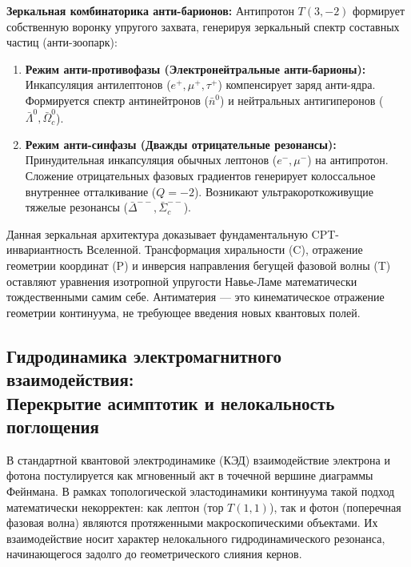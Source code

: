 \documentclass[11pt,a4paper]{article}
\begin{document}
	\textbf{Зеркальная комбинаторика анти-барионов:}
	Антипротон $T(3,-2)$ формирует собственную воронку упругого захвата, генерируя зеркальный спектр составных частиц (анти-зоопарк):
	\begin{enumerate}
		\item \textbf{Режим анти-противофазы (Электронейтральные анти-барионы):} Инкапсуляция антилептонов ($e^+, \mu^+, \tau^+$) компенсирует заряд анти-ядра. Формируется спектр антинейтронов ($\bar{n}^0$) и нейтральных антигиперонов ($\bar{\Lambda}^0, \bar{\Omega}_c^0$).
		\item \textbf{Режим анти-синфазы (Дважды отрицательные резонансы):} Принудительная инкапсуляция обычных лептонов ($e^-, \mu^-$) на антипротон. Сложение отрицательных фазовых градиентов генерирует колоссальное внутреннее отталкивание ($Q=-2$). Возникают ультракороткоживущие тяжелые резонансы ($\bar{\Delta}^{--}, \bar{\Sigma}_c^{--}$).
	\end{enumerate}
	
	Данная зеркальная архитектура доказывает фундаментальную CPT-инвариантность Вселенной. Трансформация хиральности (C), отражение геометрии координат (P) и инверсия направления бегущей фазовой волны (T) оставляют уравнения изотропной упругости Навье-Ламе математически тождественными самим себе. Антиматерия — это кинематическое отражение геометрии континуума, не требующее введения новых квантовых полей.
	
	\subsection{Гидродинамика электромагнитного взаимодействия:\\ Перекрытие асимптотик и нелокальность поглощения}
	
	В стандартной квантовой электродинамике (КЭД) взаимодействие электрона и фотона постулируется как мгновенный акт в точечной вершине диаграммы Фейнмана. В рамках топологической эластодинамики континуума такой подход математически некорректен: как лептон (тор $T(1,1)$), так и фотон (поперечная фазовая волна) являются протяженными макроскопическими объектами. Их взаимодействие носит характер нелокального гидродинамического резонанса, начинающегося задолго до геометрического слияния кернов.
	
\end{document}
